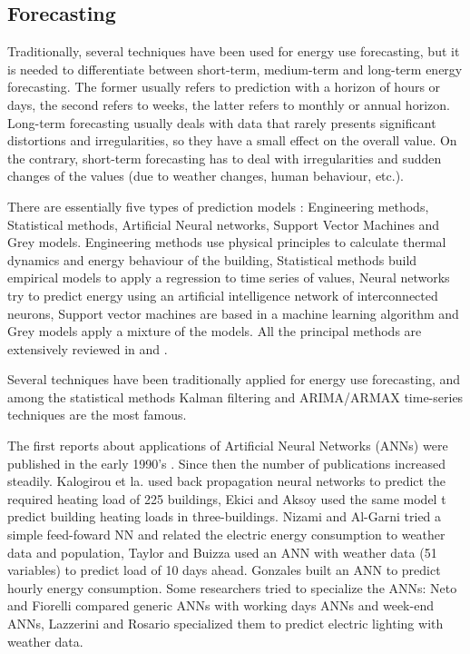 \documentclass{sig-alternate-sigmod07}
\begin{document}
\subsection{Forecasting}
Traditionally, several techniques have been used for energy use forecasting, but it is needed to differentiate between short-term, medium-term and long-term energy forecasting. The former usually refers to prediction with a horizon of hours or days, the second refers to weeks, the latter refers to monthly or annual horizon. Long-term forecasting usually deals with data that rarely presents significant distortions and irregularities, so they have a small effect on the overall value. On the contrary, short-term forecasting has to deal with irregularities and sudden changes of the values (due to weather changes, human behaviour, etc.). 

There are essentially five types of prediction models \cite{zhao2012review}: Engineering methods, Statistical methods, Artificial Neural networks, Support Vector Machines and Grey models. Engineering methods use physical principles to calculate thermal dynamics and energy behaviour of the building, Statistical methods build empirical models to apply a regression to time series of values, Neural networks try to predict energy using an artificial intelligence network of interconnected neurons, Support vector machines are based in a machine learning algorithm and Grey models apply a mixture of the models. All the principal methods are extensively reviewed in \cite{zhao2012review} and \cite{hippert2001neural}. 

Several techniques have been traditionally applied for energy use forecasting, and among the statistical methods Kalman filtering and ARIMA/ARMAX time-series techniques are the most famous. 

The first reports about applications of Artificial Neural Networks (ANNs) were published in the early 1990's \cite{czernichow1996short}. Since then the number of publications increased steadily. Kalogirou et la. \cite{kalogirou2006artificial} used back propagation neural networks to predict the required heating load of 225 buildings, Ekici and Aksoy used the same model t predict building heating loads in three-buildings. Nizami and Al-Garni \cite{JaveedNizami19951097} tried a simple feed-foward NN and related the electric energy consumption to weather data and population, Taylor and Buizza \cite{taylor2002neural} used an ANN with weather data (51 variables) to predict load of 10 days ahead. Gonzales \cite{gonzalez2005prediction} built an ANN to predict hourly energy consumption.
Some researchers tried to specialize the ANNs: Neto and Fiorelli \cite{neto2008comparison} compared generic ANNs with working days ANNs and week-end ANNs, Lazzerini and Rosario \cite{d2012neural} specialized them to predict electric lighting with weather data. 
\end{document}
